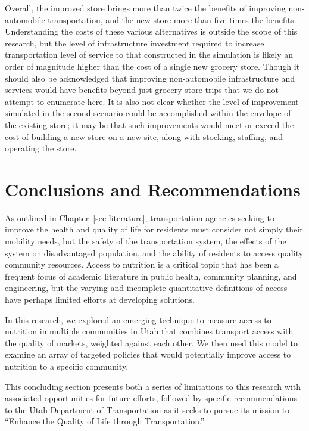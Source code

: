 \documentclass[
  letterpaper,
  DIV=11,
  numbers=noendperiod]{scrreport}
\begin{document}
Overall, the improved store brings more than twice the benefits of
improving non-automobile transportation, and the new store more than
five times the benefits. Understanding the costs of these various
alternatives is outside the scope of this research, but the level of
infrastructure investment required to increase transportation level of
service to that constructed in the simulation is likely an order of
magnitude higher than the cost of a single new grocery store. Though it
should also be acknowledged that improving non-automobile infrastructure
and services would have benefits beyond just grocery store trips that we
do not attempt to enumerate here. It is also not clear whether the level
of improvement simulated in the second scenario could be accomplished
within the envelope of the existing store; it may be that such
improvements would meet or exceed the cost of building a new store on a
new site, along with stocking, staffing, and operating the store.


\hypertarget{sec-conclude}{%
\chapter{Conclusions and Recommendations}\label{sec-conclude}}

As outlined in Chapter~\ref{sec-literature}, transportation agencies
seeking to improve the health and quality of life for residents must
consider not simply their mobility needs, but the safety of the
transportation system, the effects of the system on disadvantaged
population, and the ability of residents to access quality community
resources. Access to nutrition is a critical topic that has been a
frequent focus of academic literature in public health, community
planning, and engineering, but the varying and incomplete quantitative
definitions of access have perhaps limited efforts at developing
solutions.

In this research, we explored an emerging technique to measure access to
nutrition in multiple communities in Utah that combines transport access
with the quality of markets, weighted against each other. We then used
this model to examine an array of targeted policies that would
potentially improve access to nutrition to a specific community.

This concluding section presents both a series of limitations to this
research with associated opportunities for future efforts, followed by
specific recommendations to the Utah Department of Transportation as it
seeks to pursue its mission to ``Enhance the Quality of Life through
Transportation.''
\end{document}
